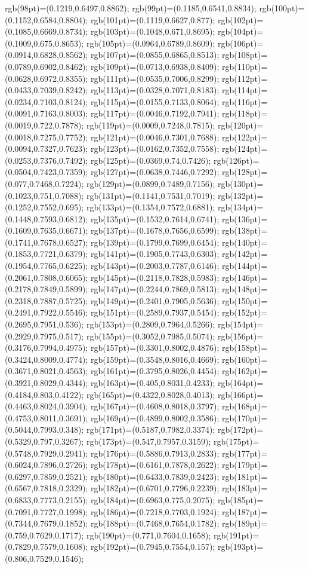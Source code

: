 {rgb(98pt)=(0.1219,0.6497,0.8862); rgb(99pt)=(0.1185,0.6541,0.8834); rgb(100pt)=(0.1152,0.6584,0.8804); rgb(101pt)=(0.1119,0.6627,0.877); rgb(102pt)=(0.1085,0.6669,0.8734); rgb(103pt)=(0.1048,0.671,0.8695); rgb(104pt)=(0.1009,0.675,0.8653); rgb(105pt)=(0.0964,0.6789,0.8609); rgb(106pt)=(0.0914,0.6828,0.8562); rgb(107pt)=(0.0855,0.6865,0.8513); rgb(108pt)=(0.0789,0.6902,0.8462); rgb(109pt)=(0.0713,0.6938,0.8409); rgb(110pt)=(0.0628,0.6972,0.8355); rgb(111pt)=(0.0535,0.7006,0.8299); rgb(112pt)=(0.0433,0.7039,0.8242); rgb(113pt)=(0.0328,0.7071,0.8183); rgb(114pt)=(0.0234,0.7103,0.8124); rgb(115pt)=(0.0155,0.7133,0.8064); rgb(116pt)=(0.0091,0.7163,0.8003); rgb(117pt)=(0.0046,0.7192,0.7941); rgb(118pt)=(0.0019,0.722,0.7878); rgb(119pt)=(0.0009,0.7248,0.7815); rgb(120pt)=(0.0018,0.7275,0.7752); rgb(121pt)=(0.0046,0.7301,0.7688); rgb(122pt)=(0.0094,0.7327,0.7623); rgb(123pt)=(0.0162,0.7352,0.7558); rgb(124pt)=(0.0253,0.7376,0.7492); rgb(125pt)=(0.0369,0.74,0.7426); rgb(126pt)=(0.0504,0.7423,0.7359); rgb(127pt)=(0.0638,0.7446,0.7292); rgb(128pt)=(0.077,0.7468,0.7224); rgb(129pt)=(0.0899,0.7489,0.7156); rgb(130pt)=(0.1023,0.751,0.7088); rgb(131pt)=(0.1141,0.7531,0.7019); rgb(132pt)=(0.1252,0.7552,0.695); rgb(133pt)=(0.1354,0.7572,0.6881); rgb(134pt)=(0.1448,0.7593,0.6812); rgb(135pt)=(0.1532,0.7614,0.6741); rgb(136pt)=(0.1609,0.7635,0.6671); rgb(137pt)=(0.1678,0.7656,0.6599); rgb(138pt)=(0.1741,0.7678,0.6527); rgb(139pt)=(0.1799,0.7699,0.6454); rgb(140pt)=(0.1853,0.7721,0.6379); rgb(141pt)=(0.1905,0.7743,0.6303); rgb(142pt)=(0.1954,0.7765,0.6225); rgb(143pt)=(0.2003,0.7787,0.6146); rgb(144pt)=(0.2061,0.7808,0.6065); rgb(145pt)=(0.2118,0.7828,0.5983); rgb(146pt)=(0.2178,0.7849,0.5899); rgb(147pt)=(0.2244,0.7869,0.5813); rgb(148pt)=(0.2318,0.7887,0.5725); rgb(149pt)=(0.2401,0.7905,0.5636); rgb(150pt)=(0.2491,0.7922,0.5546); rgb(151pt)=(0.2589,0.7937,0.5454); rgb(152pt)=(0.2695,0.7951,0.536); rgb(153pt)=(0.2809,0.7964,0.5266); rgb(154pt)=(0.2929,0.7975,0.517); rgb(155pt)=(0.3052,0.7985,0.5074); rgb(156pt)=(0.3176,0.7994,0.4975); rgb(157pt)=(0.3301,0.8002,0.4876); rgb(158pt)=(0.3424,0.8009,0.4774); rgb(159pt)=(0.3548,0.8016,0.4669); rgb(160pt)=(0.3671,0.8021,0.4563); rgb(161pt)=(0.3795,0.8026,0.4454); rgb(162pt)=(0.3921,0.8029,0.4344); rgb(163pt)=(0.405,0.8031,0.4233); rgb(164pt)=(0.4184,0.803,0.4122); rgb(165pt)=(0.4322,0.8028,0.4013); rgb(166pt)=(0.4463,0.8024,0.3904); rgb(167pt)=(0.4608,0.8018,0.3797); rgb(168pt)=(0.4753,0.8011,0.3691); rgb(169pt)=(0.4899,0.8002,0.3586); rgb(170pt)=(0.5044,0.7993,0.348); rgb(171pt)=(0.5187,0.7982,0.3374); rgb(172pt)=(0.5329,0.797,0.3267); rgb(173pt)=(0.547,0.7957,0.3159); rgb(175pt)=(0.5748,0.7929,0.2941); rgb(176pt)=(0.5886,0.7913,0.2833); rgb(177pt)=(0.6024,0.7896,0.2726); rgb(178pt)=(0.6161,0.7878,0.2622); rgb(179pt)=(0.6297,0.7859,0.2521); rgb(180pt)=(0.6433,0.7839,0.2423); rgb(181pt)=(0.6567,0.7818,0.2329); rgb(182pt)=(0.6701,0.7796,0.2239); rgb(183pt)=(0.6833,0.7773,0.2155); rgb(184pt)=(0.6963,0.775,0.2075); rgb(185pt)=(0.7091,0.7727,0.1998); rgb(186pt)=(0.7218,0.7703,0.1924); rgb(187pt)=(0.7344,0.7679,0.1852); rgb(188pt)=(0.7468,0.7654,0.1782); rgb(189pt)=(0.759,0.7629,0.1717); rgb(190pt)=(0.771,0.7604,0.1658); rgb(191pt)=(0.7829,0.7579,0.1608); rgb(192pt)=(0.7945,0.7554,0.157); rgb(193pt)=(0.806,0.7529,0.1546); }
